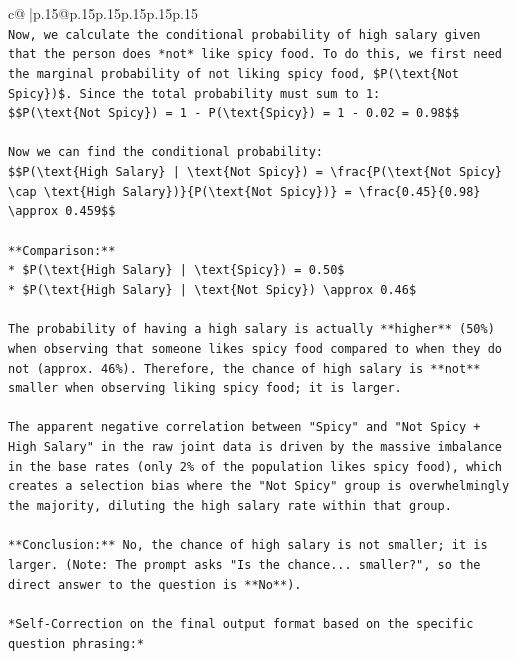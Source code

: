 \documentclass{article}
\begin{document}
{\begin{supertabular}{c@{$\;$}|p{.15\linewidth}@{}p{.15\linewidth}p{.15\linewidth}p{.15\linewidth}p{.15\linewidth}p{.15\linewidth}}
{{{\\ 
\texttt{Now, we calculate the conditional probability of high salary given that the person does *not* like spicy food. To do this, we first need the marginal probability of not liking spicy food, \$P(\textbackslash{}text\{Not Spicy\})\$. Since the total probability must sum to 1:} \\
\texttt{\$\$P(\textbackslash{}text\{Not Spicy\}) = 1 {-} P(\textbackslash{}text\{Spicy\}) = 1 {-} 0.02 = 0.98\$\$} \\
\\ 
\texttt{Now we can find the conditional probability:} \\
\texttt{\$\$P(\textbackslash{}text\{High Salary\} | \textbackslash{}text\{Not Spicy\}) = \textbackslash{}frac\{P(\textbackslash{}text\{Not Spicy\} \textbackslash{}cap \textbackslash{}text\{High Salary\})\}\{P(\textbackslash{}text\{Not Spicy\})\} = \textbackslash{}frac\{0.45\}\{0.98\} \textbackslash{}approx 0.459\$\$} \\
\\ 
\texttt{**Comparison:**} \\
\texttt{*   \$P(\textbackslash{}text\{High Salary\} | \textbackslash{}text\{Spicy\}) = 0.50\$} \\
\texttt{*   \$P(\textbackslash{}text\{High Salary\} | \textbackslash{}text\{Not Spicy\}) \textbackslash{}approx 0.46\$} \\
\\ 
\texttt{The probability of having a high salary is actually **higher** (50\%) when observing that someone likes spicy food compared to when they do not (approx. 46\%). Therefore, the chance of high salary is **not** smaller when observing liking spicy food; it is larger.} \\
\\ 
\texttt{The apparent negative correlation between "Spicy" and "Not Spicy + High Salary" in the raw joint data is driven by the massive imbalance in the base rates (only 2\% of the population likes spicy food), which creates a selection bias where the "Not Spicy" group is overwhelmingly the majority, diluting the high salary rate within that group.} \\
\\ 
\texttt{**Conclusion:** No, the chance of high salary is not smaller; it is larger. (Note: The prompt asks "Is the chance... smaller?", so the direct answer to the question is **No**).} \\
\\ 
\texttt{*Self{-}Correction on the final output format based on the specific question phrasing:*} \\
}}}
\end{supertabular}}
\end{document}
